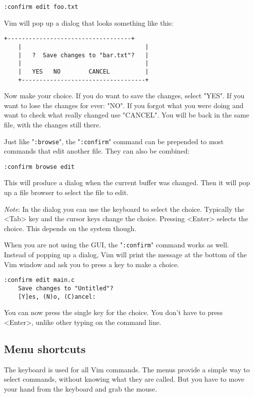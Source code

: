 \begin{Verbatim}[samepage=true]
 :confirm edit foo.txt
\end{Verbatim}

Vim will pop up a dialog that looks something like this:

\begin{Verbatim}[samepage=true]
    +-----------------------------------+
    |                                   |
    |   ?  Save changes to "bar.txt"?   |
    |                                   |
    |   YES   NO        CANCEL          |
    +-----------------------------------+
\end{Verbatim}

Now make your choice.
If you do want to save the changes, select "YES".
If you want to lose the changes for ever: "NO".
If you forgot what you were doing and want to check what really changed use "CANCEL".
You will be back in the same file, with the changes still there.

Just like "\texttt{:browse}", the "\texttt{:confirm}" command can be prepended to most commands that edit another file.
They can also be combined:

\begin{Verbatim}[samepage=true]
 :confirm browse edit
\end{Verbatim}

This will produce a dialog when the current buffer was changed.
Then it will pop up a file browser to select the file to edit.

\emph{Note}: In the dialog you can use the keyboard to select the choice.
Typically the <Tab> key and the cursor keys change the choice.
Pressing <Enter> selects the choice.
This depends on the system though.

When you are not using the GUI, the "\texttt{:confirm}" command works as well.
Instead of popping up a dialog, Vim will print the message at the bottom of the Vim window and ask you to press a key to make a choice.

\begin{Verbatim}[samepage=true]
 :confirm edit main.c
    Save changes to "Untitled"? 
    [Y]es, (N)o, (C)ancel:  
\end{Verbatim}

You can now press the single key for the choice.
You don't have to press <Enter>, unlike other typing on the command line.
\subsection{Menu shortcuts}
The keyboard is used for all Vim commands.
The menus provide a simple way to select commands, without knowing what they are called.
But you have to move your hand from the keyboard and grab the mouse.


